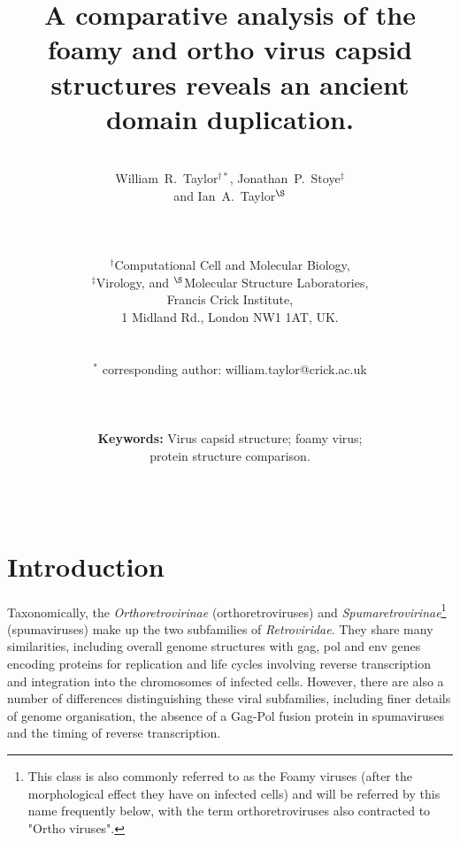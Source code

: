 \documentclass[12pt]{article}
\newcommand{\3}{$3_{10}$}
\begin{document}
\title{\bf A comparative analysis of the foamy and ortho virus capsid structures
           reveals an ancient domain duplication.
}

\author{\\William~R.~Taylor$^{\dagger*}$,
Jonathan~P.~Stoye$^{\ddagger}$\\
and
Ian~A.~Taylor$^{\S}$\\ \\ \\ \\
$^\dagger$Computational Cell and Molecular Biology,\\
$^\ddagger$Virology, and
$^\S$Molecular Structure Laboratories,\\
Francis Crick Institute,\\
1 Midland Rd., London NW1 1AT, UK.\\ \\ \\
$^*$ corresponding author: william.taylor@crick.ac.uk\\ \\ \\ \\
{\bf Keywords:} Virus capsid structure; foamy virus;\\ protein structure comparison.\\ \\ \\
}
\begin{singlespace}
\maketitle
\end{singlespace}
\clearpage
%
\clearpage
%
\section{Introduction}

Taxonomically, the {\em Orthoretrovirinae} (orthoretroviruses) and {\em Spumaretrovirinae}\footnote{
This class is also commonly referred to as the Foamy viruses (after the morphological effect they have on infected cells)
and will be referred by this name frequently below, with the term orthoretroviruses also contracted to "Ortho viruses".
} 
(spumaviruses) make up the two subfamilies of {\em Retroviridae}. They share many similarities, including overall genome
structures with gag, pol and env genes encoding proteins for replication and life cycles involving reverse transcription
and integration into the chromosomes of infected cells. However, there are also a number of differences distinguishing these
viral subfamilies, including finer details of genome organisation, the absence of a Gag-Pol fusion protein in spumaviruses
and the timing of reverse transcription.
\end{document}
